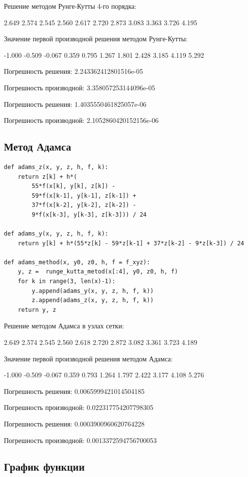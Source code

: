 \documentclass[pdf, unicode, 12pt, a4paper,oneside,fleqn]{article}
\begin{document}
Решение методом Рунге-Кутты 4-го порядка:

2.649 2.574 2.545 2.560 2.617 2.720 2.873 3.083 3.363 3.726 4.195 

Значение первой производной решения методом Рунге-Кутты:

-1.000 -0.509 -0.067 0.359 0.795 1.267 1.801 2.428 3.185 4.119 5.292 

Погрешность решения: 2.243362412801516e-05

Погрешность производной: 3.358057253144096e-05

Погрешность решения: 1.4035550461825057e-06

Погрешность производной: 2.1052860420152156e-06

\subsection{Метод Адамса}

\begin{lstlisting}
def adams_z(x, y, z, h, f, k):
    return z[k] + h*(
        55*f(x[k], y[k], z[k]) -
        59*f(x[k-1], y[k-1], z[k-1]) +
        37*f(x[k-2], y[k-2], z[k-2]) -
        9*f(x[k-3], y[k-3], z[k-3])) / 24

def adams_y(x, y, z, h, f, k):
    return y[k] + h*(55*z[k] - 59*z[k-1] + 37*z[k-2] - 9*z[k-3]) / 24

def adams_method(x, y0, z0, h, f = f_xyz):
    y, z =  runge_kutta_metod(x[:4], y0, z0, h, f)
    for k in range(3, len(x)-1):
        y.append(adams_y(x, y, z, h, f, k))
        z.append(adams_z(x, y, z, h, f, k))
    return y, z
\end{lstlisting}

Решение методом Адамса в узлах сетки:

2.649 2.574 2.545 2.560 2.618 2.720 2.872 3.082 3.361 3.723 4.189 

Значение первой производной решения методом Адамса:

-1.000 -0.509 -0.067 0.359 0.793 1.264 1.797 2.422 3.177 4.108 5.276 

Погрешность решения: 0.0065999421014504185

Погрешность производной: 0.022317754207798305

Погрешность решения: 0.0003900960620764228

Погрешность производной: 0.0013372594756700053

\subsection{График функции}
\end{document}

